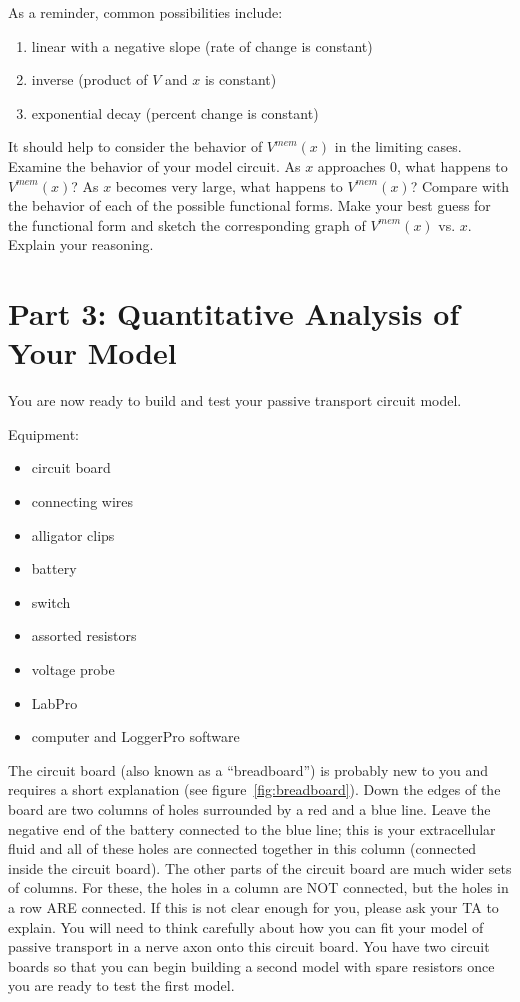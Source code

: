 As a reminder, common possibilities include:
\begin{enumerate}
\itemsep-0.2em
\item linear with a negative slope (rate of change is constant)
\item inverse (product of $V$ and $x$ is constant)
\item exponential decay (percent change is constant)
\end{enumerate}
It should help to consider the behavior of $V^{mem}(x)$ in the limiting cases.
Examine the behavior of your model circuit.
As $x$ approaches $0$, what happens to $V^{mem}(x)$?
As $x$ becomes very large, what happens to $V^{mem}(x)$?
Compare with the behavior of each of the possible functional forms.
Make your best guess for the functional form and sketch the corresponding graph of $V^{mem}(x)$ vs. $x$.
Explain your reasoning.

\newpage

\section*{Part 3: Quantitative Analysis of Your Model}
You are now ready to build and test your passive transport circuit model.
\par 
Equipment:
\begin{itemize}
	\itemsep-0.2em
	\item circuit board
	\item connecting wires
	\item alligator clips
	\item battery 
	\item switch
	\item assorted resistors
	\item voltage probe
	\item LabPro
	\item computer and LoggerPro software
\end{itemize}
The circuit board (also known as a ``breadboard'') is probably new to you and requires a short explanation (see figure~\ref{fig:breadboard}).
Down the edges of the board are two columns of holes surrounded by a red and a blue line.
Leave the negative end of the battery connected to the blue line; this is your extracellular fluid and all of these holes are connected together in this column (connected inside the circuit board).
The other parts of the circuit board are much wider sets of columns.
For these, the holes in a column are NOT connected, but the holes in a row ARE connected.
If this is not clear enough for you, please ask your TA to explain.
You will need to think carefully about how you can fit your model of passive transport in a nerve axon onto this circuit board.
You have two circuit boards so that you can begin building a second model with spare resistors once you are ready to test the first model.
\par 

